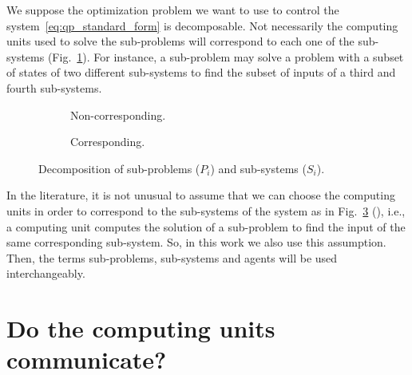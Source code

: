 \documentclass[../main.tex]{subfiles}
\begin{document}
We suppose the optimization problem we want to use to control the system~\eqref{eq:qp_standard_form} is decomposable.
Not necessarily the computing units used to solve the sub-problems will correspond to each one of the sub-systems (Fig.~\ref{fig:noncorresponding_division_system_problem}).
For instance, a sub-problem may solve a problem with a subset of states of two different sub-systems to find the subset of inputs of a third and fourth sub-systems.

\begin{figure}[h] \centering
  \begin{subfigure}{.4\textwidth}
    \centering
    \def\svgwidth{.8\textwidth}
    
    \caption{Non-corresponding.}\label{fig:noncorresponding_division_system_problem}
  \end{subfigure} \hfill
  \begin{subfigure}{.4\textwidth} \centering
    \def\svgwidth{.8\textwidth}
    
    \caption{Corresponding.}\label{fig:corresponding_division_system_problem}
  \end{subfigure}
  \caption{Decomposition of sub-problems ($P_i$) and
    sub-systems ($S_{i}$).}
\end{figure}

In the literature, it is not unusual to assume that we can choose the computing units in order to correspond to the sub-systems of the system as in Fig.~\ref{fig:corresponding_division_system_problem} (), i.e., a computing unit computes the solution of a sub-problem to find the input of the same corresponding sub-system.
So, in this work we also use this assumption.
Then, the terms sub-problems, sub-systems and agents will be used interchangeably.

\section{Do the computing units communicate?}
\end{document}
